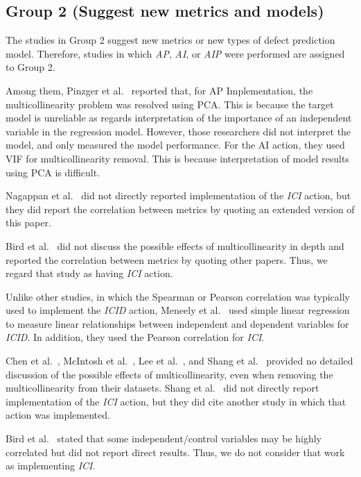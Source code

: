 \subsection{Group 2 (Suggest new metrics and models)} 
The studies in Group 2 suggest new metrics or new types of defect prediction model. Therefore, studies in which \textit{AP}, \textit{AI}, or \textit{AIP} were performed are assigned to Group 2. 

Among them, Pinzger et al.~\cite{Pinzger2008FSEnetwork} reported that, for AP Implementation, the multicollinearity problem was resolved using PCA. This is because the target model is unreliable as regards interpretation of the importance of an independent variable in the regression model. However, those researchers did not interpret the model, and only measured the model performance. For the AI action, they used VIF for multicollinearity removal. This is because interpretation of model results using PCA is difficult. 

Nagappan et al.~\cite{Nagappan2008ICSEorg} did not directly reported implementation of the \textit{ICI} action, but they did report the correlation between metrics by quoting an extended version of this paper.

Bird et al.~\cite{Bird2011FSEdonttouch} did not discuss the possible effects of multicollinearity in depth and reported the correlation between metrics by quoting other papers. Thus, we regard that study as having \textit{ICI} action.

Unlike other studies, in which the Spearman or Pearson correlation was typically used to implement the \textit{ICID} action, Meneely et al.~\cite{Meneely2011FSEmanpower} used simple linear regression to measure linear relationships between independent and dependent variables for \textit{ICID}. In addition, they used the Pearson correlation for \textit{ICI}.

Chen et al.~\cite{Chen2012MSRExplaining}, McIntosh et al.~\cite{McIntosh2014MSRCodeReview}, Lee et al.~\cite{Lee2016TSEMIM}, and Shang et al.~\cite{Shang2015EMSElog} provided no detailed discussion of the possible effects of multicollinearity, even when removing the multicollinearity from their datasets. Shang et al.~\cite{Shang2015EMSElog} did not directly report implementation of the \textit{ICI} action, but they did cite another study in which that action was implemented. 

Bird et al.~\cite{Bird2012MSRdistributed} stated that some independent/control variables may be highly correlated but did not report direct results. Thus, we do not consider that work as implementing \textit{ICI}.

